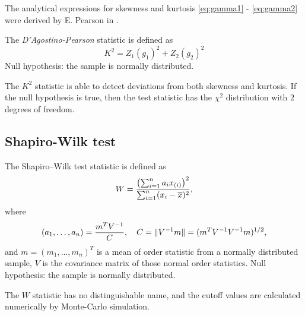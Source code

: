         The analytical expressions for skewness and kurtosis \eqref{eq:gamma1} - \eqref{eq:gamma2} were derived by E. Pearson in \cite{Pearson1931}.
        \begin{definition}
            The \emph{D'Agostino-Pearson} statistic is defined as 
            \begin{equation}
                K^2 = Z_1(g_1)^2 + Z_2(g_2)^2
            \end{equation}
            Null hypothesis: the sample is normally distributed.
        \end{definition}

        \begin{nb}
            The $K^2$ statistic is able to detect deviations from both skewness and kurtosis. 
            If the null hypothesis is true, then the test statistic has the $\chi^2$ 
            distribution with $2$ degrees of freedom. 
        \end{nb}

    \subsection{Shapiro-Wilk test}
        \begin{definition}
            The Shapiro–Wilk test statistic is defined as
            \begin{equation}
                W = {\left(\sum_{i=1}^n a_i x_{(i)}\right)^2 \over \sum_{i=1}^n (x_i-\overline{x})^2},
            \end{equation}
            where
            \begin{equation*}
                (a_1, \dots, a_n) = {m^{T} V^{-1} \over C}, \quad C = \| V^{-1} m \| = (m^{T} V^{-1}V^{-1}m)^{1/2},
            \end{equation*}
            and $m = (m_1, \dots, m_n)^{T}$ is a mean of order statistic from a normally distributed sample, $V$ is the covariance matrix of those normal order statistics. 
            Null hypothesis: the sample is normally distributed.
        \end{definition}

        \begin{nb}
            The $W$ statistic has no distinguishable name, and the cutoff values are calculated numerically by Monte-Carlo simulation.
        \end{nb}